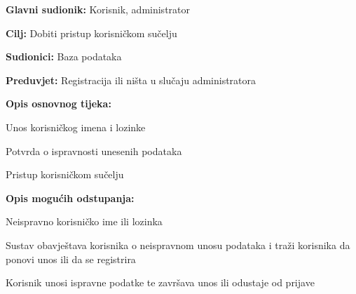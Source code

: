 					\noindent {}
					\begin{packed_item}
						
						\item \textbf{Glavni sudionik: }Korisnik, administrator
						\item  \textbf{Cilj:} Dobiti pristup korisničkom sučelju
						\item  \textbf{Sudionici:} Baza podataka
						\item  \textbf{Preduvjet:} Registracija ili ništa u slučaju administratora
						\item  \textbf{Opis osnovnog tijeka:}
						
						\item[] \begin{packed_enum}
							
							\item Unos korisničkog imena i lozinke
							\item Potvrda o ispravnosti unesenih podataka
							\item Pristup korisničkom sučelju

						\end{packed_enum}
						
						\item  \textbf{Opis mogućih odstupanja:}
						
						\item[] \begin{packed_item}
							
							\item[2.a] Neispravno korisničko ime ili lozinka
							\item[] \begin{packed_enum}

								\item Sustav obavještava korisnika o neispravnom unosu podataka i traži korisnika da ponovi unos ili da se registrira
								\item Korisnik unosi ispravne podatke te završava unos ili odustaje od prijave
								
							\end{packed_enum}
							
						\end{packed_item}
					\end{packed_item}
					
